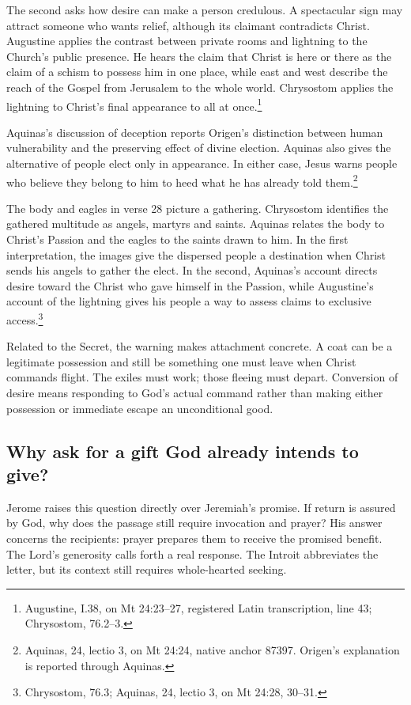 The second asks how desire can make a person credulous. A spectacular sign
may attract someone who wants relief, although its claimant contradicts
Christ. Augustine applies the contrast between private rooms and lightning
to the Church's public presence. He hears the claim that Christ is here
or there as the claim of a schism to possess him in one place, while
east and west describe the reach of the Gospel from Jerusalem to the
whole world. Chrysostom applies the lightning to Christ's final
appearance to all at once.\footnote{Augustine,  I.38, on Mt 24:23--27, registered Latin transcription,
line 43; Chrysostom,  76.2--3.}

Aquinas's discussion of deception reports Origen's distinction between
human vulnerability and the preserving effect of divine election.
Aquinas also gives the alternative of people elect only in appearance.
In either case, Jesus warns people who believe they belong to him to
heed what he has already told them.\footnote{Aquinas,
 24, lectio 3,
on Mt 24:24, native anchor 87397. Origen's explanation is reported
through Aquinas.}

The body and eagles in verse 28 picture a gathering. Chrysostom
identifies the gathered multitude as angels, martyrs and saints.
Aquinas relates the body to Christ's Passion and the eagles to the
saints drawn to him. In the
first interpretation, the images give the dispersed people a destination
when Christ sends his angels to gather the elect. In the second,
Aquinas's account directs desire toward the Christ who gave himself in
the Passion, while Augustine's account of the lightning gives his
people a way to assess claims to exclusive access.\footnote{Chrysostom,
 76.3;
Aquinas,  24, lectio 3, on Mt 24:28, 30--31.}

Related to the Secret, the warning makes attachment concrete. A coat can
be a legitimate possession and still be something one must leave when
Christ commands flight. The exiles must work; those fleeing must depart.
Conversion of desire means responding to God's actual command rather
than making either possession or immediate escape an unconditional good.

\subsection{Why ask for a gift God already intends to give?}

Jerome raises this question directly over Jeremiah's promise. If return
is assured by God, why does the passage still require invocation and
prayer? His answer concerns the recipients: prayer prepares them to receive
the promised benefit. The Lord's generosity calls forth a real response.
The Introit abbreviates the letter, but its context still requires
whole-hearted seeking.

